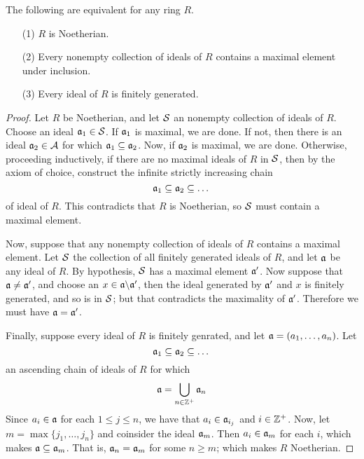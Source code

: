\begin{theorem}\label{1.4.2}
    The following are equivalent for any ring $R$.
    \begin{enumerate}
        \item[(1)] $R$ is Noetherian.

        \item[(2)] Every nonempty collection of ideals of $R$ contains a maximal
            element under inclusion.

        \item[(3)] Every ideal of $R$ is finitely generated.
    \end{enumerate}
\end{theorem}
\begin{proof}
    Let $R$ be Noetherian, and let  $\mathcal{S}$ an nonempty collection of ideals of
    $R$. Choose an ideal  $\mathfrak{a}_1 \in \mathcal{S}$. If $\mathfrak{a}_1$ is maximal, we are done. If
    not, then there is an ideal $\mathfrak{a}_2 \in \mathcal{A}$ for which  $\mathfrak{a}_1 \subseteq \mathfrak{a}_2$.
    Now, if $\mathfrak{a}_2$ is maximal, we are done. Otherwise, proceeding inductively, if
    there are no maximal ideals of $R$ in $\mathcal{S}$, then by the axiom of choice,
    construct the infinite strictly increasing chain
    \begin{equation*}
         \mathfrak{a}_1 \subseteq \mathfrak{a}_2 \subseteq \dots
    \end{equation*}
    of ideal of $R$. This contradicts that  $R$ is Noetherian, so  $\mathcal{S}$ must
    contain a maximal element.

    Now, suppose that any nonempty collection of ideals of  $R$ contains
    a maximal element. Let  $\mathcal{S}$ the collection of all finitely generated
    ideals of $R$, and let $\mathfrak{a}$ be any ideal of  $R$. By hypothesis, $\mathcal{S}$ has a
    maximal element  $\mathfrak{a}'$. Now suppose that $\mathfrak{a} \neq \mathfrak{a}'$, and choose an
    $x \in \mathfrak{a} \backslash \mathfrak{a}'$, then the ideal generated by $\mathfrak{a}'$ and  $x$ is finitely
    generated, and so is in  $\mathcal{S}$; but that contradicts the maximality of  $\mathfrak{a}'$.
    Therefore we must have  $\mathfrak{a}=\mathfrak{a}'$.

    Finally, suppose every ideal of $R$ is finitely genrated, and let
    $\mathfrak{a}=(a_1, \dots, a_n)$. Let
    \begin{equation*}
        \mathfrak{a}_1 \subseteq \mathfrak{a}_2 \subseteq \dots
    \end{equation*}
    an ascending chain of ideals of $R$ for which
    \begin{equation*}
        \mathfrak{a}=\bigcup_{n \in \mathbb{Z}^+}{\mathfrak{a}_n}
    \end{equation*}
    Since $a_i \in \mathfrak{a}$ for each  $1 \leq j \leq n$, we have that  $a_i \in
    \mathfrak{a}_{i_j}$ and $i \in \mathbb{Z}^+$. Now, let  $m=\max{\{j_1, \dots, j_n\}}$ and
    coinsider the ideal $\mathfrak{a}_m$. Then  $a_i \in \mathfrak{a}_m$ for each $i$, which makes
    $\mathfrak{a} \subseteq \mathfrak{a}_m$. That is, $\mathfrak{a}_n=\mathfrak{a}_m$ for some  $n \geq m$; which
    makes $R$ Noetherian.
\end{proof}

